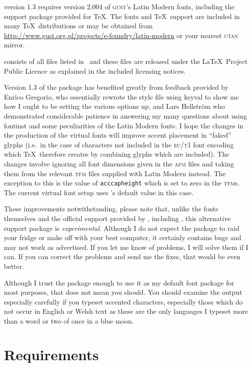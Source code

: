 \documentclass[11pt,british]{article}
\begin{document}
 version 1.3 requires version 2.004 of \textsc{gust}'s Latin Modern fonts, including the support package provided for \TeX. The fonts and \TeX\ support are included in many \TeX\ distributions or may be obtained from \url{http://www.gust.org.pl/projects/e-foundry/latin-modern} or your nearest \textsc{ctan} mirror.

 consists of all files listed in \ and these files are released under the \LaTeX\ Project Public Licence as explained in the included licensing notices.

Version 1.3 of the package has benefited greatly from feedback provided by Enrico Gregorio, who essentially rewrote the style file using keyval to show me how I ought to be setting the various options up, and Lars Hellström who demonstrated considerable patience in answering my many questions about using fontinst and some peculiarities of the Latin Modern fonts. I hope the changes in the production of the virtual fonts will improve accent placement in ``faked'' glyphs (i.e.\ in the case of characters not included in the \textsc{ec}/\textsc{t1} font encoding which \TeX\ therefore creates by combining glyphs which are included). The changes involve ignoring all font dimensions given in the \textsc{afm} files and taking them from the relevant \textsc{tfm} files supplied with Latin Modern instead. The exception to this is the value of \verb|acccapheight| which is set to zero in the \textsc{tfm}s. The current virtual font setup uses 's default value in this case.

These improvements notwithstanding, please note that, unlike the fonts themselves and the official support provided by , including , this alternative support package is \emph{experimental}. Although I do not expect the package to raid your fridge or make off with your best computer, it certainly contains bugs and may not work as advertised. If you let me know of problems, I will solve them if I can. If you can correct the problems and send me the fixes, that would be even better.

Although I trust the package enough to use it as my default font package for most purposes, that does not mean you should. You should examine the output especially carefully if you typeset accented characters, especially those which do not occur in English or Welsh text as these are the only languages I typeset more than a word or two of once in a blue moon.

\section{Requirements}\label{sec:require}
\end{document}
